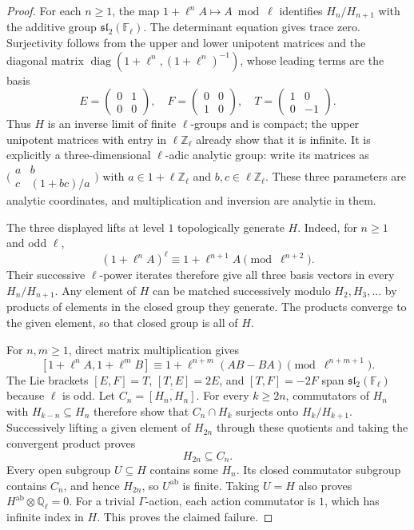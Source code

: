 \documentclass[11pt,a4paper]{article}
\begin{document}
\begin{proof}
For each $n\ge1$, the map
$1+\ell^n A\mapsto A\bmod\ell$ identifies
$H_n/H_{n+1}$ with the additive group
$\mathfrak{sl}_2(\mathbb F_\ell)$. The determinant equation gives
trace zero. Surjectivity follows from the upper and lower unipotent
matrices and the diagonal matrix
$\operatorname{diag}(1+\ell^n,(1+\ell^n)^{-1})$, whose leading terms
are the basis
\[
 E=\begin{pmatrix}0&1\\0&0\end{pmatrix},\quad
 F=\begin{pmatrix}0&0\\1&0\end{pmatrix},\quad
 T=\begin{pmatrix}1&0\\0&-1\end{pmatrix}.
\]
Thus $H$ is an inverse limit of finite $\ell$-groups and is compact;
the upper unipotent matrices with entry in $\ell\mathbb Z_\ell$
already show that it is infinite.
It is explicitly a three-dimensional $\ell$-adic analytic group:
write its matrices as
$\bigl(\begin{smallmatrix}a&b\\c&(1+bc)/a\end{smallmatrix}\bigr)$
with $a\in1+\ell\mathbb Z_\ell$ and
$b,c\in\ell\mathbb Z_\ell$. These three parameters are analytic
coordinates, and multiplication and inversion are analytic in them.

The three displayed lifts at level $1$ topologically generate $H$.
Indeed, for $n\ge1$ and odd $\ell$,
\[
 (1+\ell^n A)^\ell\equiv1+\ell^{n+1}A
                       \pmod{\ell^{n+2}}.
\]
Their successive $\ell$-power iterates therefore give all three basis
vectors in every $H_n/H_{n+1}$. Any element of $H$ can be matched
successively modulo $H_2,H_3,\ldots$ by products of elements in the
closed group they generate. The products converge to the given element,
so that closed group is all of $H$.

For $n,m\ge1$, direct matrix multiplication gives
\[
 [1+\ell^n A,1+\ell^m B]
       \equiv1+\ell^{n+m}(AB-BA)
                      \pmod{\ell^{n+m+1}}.
\]
The Lie brackets $[E,F]=T$, $[T,E]=2E$, and $[T,F]=-2F$
span $\mathfrak{sl}_2(\mathbb F_\ell)$ because $\ell$ is odd.
Let $C_n=\overline{[H_n,H_n]}$. For every $k\ge2n$, commutators
of $H_n$ with $H_{k-n}\subseteq H_n$ therefore show that
$C_n\cap H_k$ surjects onto $H_k/H_{k+1}$. Successively lifting a
given element of $H_{2n}$ through these quotients and taking the
convergent product proves
\[
 H_{2n}\subseteq C_n.
\]
Every open subgroup $U\subseteq H$ contains some $H_n$. Its closed
commutator subgroup contains $C_n$, and hence $H_{2n}$, so
$U^{\mathrm{ab}}$ is finite. Taking $U=H$ also proves
$H^{\mathrm{ab}}\otimes\mathbb Q_\ell=0$.
For a trivial $\Gamma$-action, each action commutator is $1$,
which has infinite index in $H$. This proves the claimed failure.
\end{proof}
\end{document}
